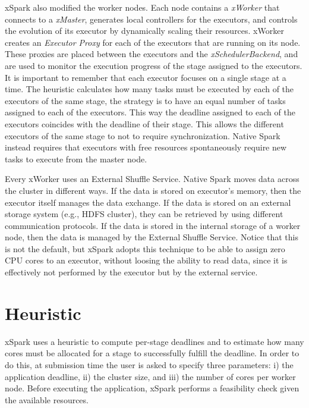 xSpark also modified the worker nodes. Each node contains a \textit{xWorker} that connects to a \textit{xMaster}, generates local controllers for the executors, and controls the evolution of its executor by dynamically scaling their resources. xWorker creates an \textit{Executor Proxy} for each of the executors that are running on its node. These proxies are placed between the executors and the \textit{xSchedulerBackend}, and are used to monitor the execution progress of the stage assigned to the executors. It is important to remember that each executor focuses on a single stage at a time. The heuristic calculates how many tasks must be executed by each of the executors of the same stage, the strategy is to have an equal number of tasks assigned to each of the executors. This way the deadline assigned to each of the executors coincides with the deadline of their stage. This allows the different executors of the same stage to
not to require synchronization. Native Spark instead requires that executors with free resources spontaneously require new tasks to execute from the master node. 

Every xWorker uses an External Shuffle Service. Native Spark moves data across the cluster in different ways. If the data is stored on executor’s memory, then the executor itself manages the data exchange. If the data is stored on an external storage system (e.g., HDFS cluster),
they can be retrieved by using different communication protocols. If the data is stored in the internal storage of a worker node, then the data is managed by the External Shuffle Service. Notice that this is not the default, but xSpark adopts this technique to be able to assign
zero CPU cores to an executor, without loosing the ability to read data, since it is effectively not performed by the executor but by the external service.

\section{Heuristic}\label{sec:heuristic}
xSpark uses a heuristic to compute per-stage deadlines and to estimate how many cores must be allocated for a stage to successfully fulfill the deadline. In order to do this, at submission time the user is asked to specify three parameters: i) the application deadline, ii) the cluster size, and iii) the number of cores per worker node. Before executing the application, xSpark performs a feasibility check given the available resources.

